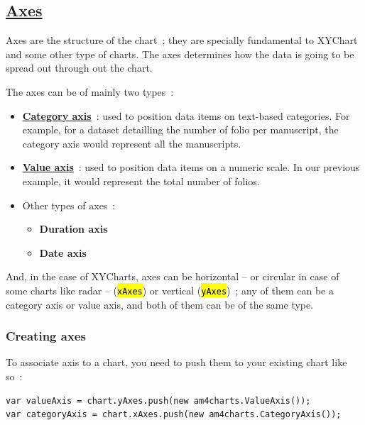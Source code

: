 \documentclass[a4paper,12pt,twoside]{book}
\let\OldTexttt\texttt
\renewcommand{\texttt}[1]{\OldTexttt{\hl{#1}}}
\begin{document}
			\subsection{\href{https://www.amcharts.com/docs/v4/concepts/axes/}{Axes}}\label{axes}

Axes are the structure of the chart~; they are specially fundamental to XYChart and some other type of charts. The axes determines how the data is going to be spread out through out the chart.

The axes can be of mainly two types~:

\begin{itemize}
	\item \href{https://www.amcharts.com/docs/v4/concepts/axes/category-axis/}{\textbf{Category axis}}~: used to position data items on text-based categories. For example, for a dataset detailling the number of folio per manuscript, the category axis would represent all the manuscripts.
	\item \href{https://www.amcharts.com/docs/v4/concepts/axes/value-axis/}{\textbf{Value axis}}~: used to position data items on a numeric scale. In our previous example, it would represent the total number of folios.
	\item Other types of axes~:
	\begin{itemize}
		\item \textbf{Duration axis}
		\item \textbf{Date axis}
	\end{itemize}
\end{itemize}

And, in the case of XYCharts, axes can be horizontal -- or circular in case of some charts like radar -- (\texttt{xAxes}) or vertical (\texttt{yAxes})~; any of them can be a category axis or value axis, and both of them can be of the same type.

				\subsubsection{Creating axes}\label{creating-axes}

To associate axis to a chart, you need to push them to your existing chart like so~:

\begin{lstlisting}
var valueAxis = chart.yAxes.push(new am4charts.ValueAxis());
var categoryAxis = chart.xAxes.push(new am4charts.CategoryAxis());
\end{lstlisting}
\end{document}
